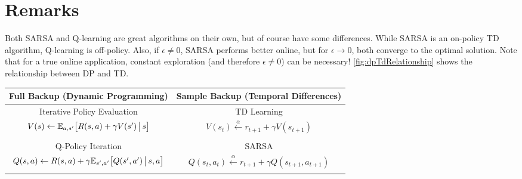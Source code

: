 	\section{Remarks}
		Both \ac{SARSA} and Q-learning are great algorithms on their own, but of course have some differences. While \ac{SARSA} is an on-policy \ac{TD} algorithm, Q-learning is off-policy. Also, if \(\epsilon \neq 0\), \ac{SARSA} performs better online, but for \(\epsilon \to 0\), both converge to the optimal solution. Note that for a true online application, constant exploration (and therefore \(\epsilon \neq 0\)) can be necessary! \autoref{fig:dpTdRelationship} shows the relationship between \ac{DP} and \ac{TD}.

		\begin{table}
			\centering
			\begin{tabular}{c|c}
				\toprule
				                               \textbf{Full Backup (Dynamic Programming)}                                 &                              \textbf{Sample Backup (Temporal Differences)}                              \\ \midrule
				                                       Iterative Policy Evaluation                                        &                                            \acs{TD} Learning                                            \\
				               \( V(s) \gets \mathbb{E}_{a, s'}\bigl[ R(s, a) + \gamma V(s') \,\big\vert\, s \bigr] \)                &                  \( V(s_t) \overset{\alpha}{\gets} r_{t + 1} + \gamma V(s_{t + 1}) \)                   \\
				                                                                                                          &                                                                                                         \\
				                                           Q-Policy Iteration                                             &                                               \acs{SARSA}                                               \\
				         \( Q(s, a) \gets R(s, a) + \gamma \mathbb{E}_{s', a'}\bigl[ Q(s', a') \,\big\vert\, s, a \bigr] \)           &          \( Q(s_t, a_t) \overset{\alpha}{\gets} r_{t + 1} + \gamma Q(s_{t + 1}, a_{t + 1}) \)           \\
				                                                                                                          &                                                                                                         \\

\end{tabular}
\end{table}
